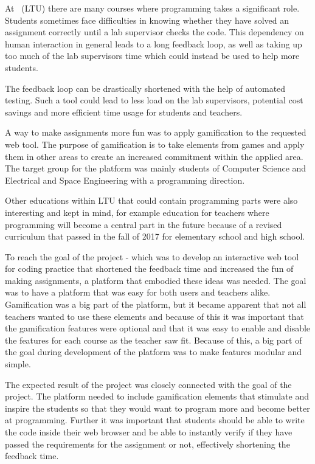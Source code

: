 At \LTU\ (LTU) there are many courses where programming takes a significant role. Students sometimes face difficulties in knowing whether they have solved an assignment correctly until a lab supervisor checks the code. This dependency on human interaction in general leads to a long feedback loop, as well as taking up too much of the lab supervisors time which could instead be used to help more students. 

The feedback loop can be drastically shortened with the help of automated testing. Such a tool could lead to less load on the lab supervisors, potential cost savings and more efficient time usage for students and teachers.

A way to make assignments more fun was to apply gamification to the requested web tool. The purpose of gamification is to take elements from games and apply them in other areas to create an increased commitment within the applied area. The target group for the platform was mainly students of Computer Science and Electrical and Space Engineering with a programming direction.

Other educations within LTU that could contain programming parts were also interesting and kept in mind, for example education for teachers where programming will become a central part in the future because of a revised curriculum that passed in the fall of 2017 for elementary school and high school.

To reach the goal of the project - which was to develop an interactive web tool for coding practice that shortened the feedback time and increased the fun of making assignments, a platform that embodied these ideas was needed. The goal was to have a platform that was easy for both users and teachers alike. Gamification was a big part of the platform, but it became apparent that not all teachers wanted to use these elements and because of this it was important that the gamification features were optional and that it was easy to enable and disable the features for each course as the teacher saw fit. Because of this, a big part of the goal during development of the platform was to make features modular and simple.

The expected result of the project was closely connected with the goal of the project. The platform needed to include gamification elements that stimulate and inspire the  students so that they would want to program more and become better at programming. Further it was important that students should be able to write the code inside their web browser and be able to instantly verify if they have passed the requirements for the assignment or not, effectively shortening the feedback time.

